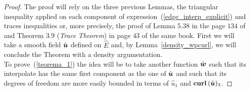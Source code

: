 \begin{proof}
The proof will rely on the three previous Lemmas, 
the triangular inequality applied on each component of 
expression~(\ref{edge_interp_explicit}) and traces inequalities or,
more precisely, the proof
of Lemma $5.38$ in the page $134$ of~\cite{monk}
and Theorem $3.9$ (\emph{Trace Theorem})
in page $43$ of
the same book.
First we will take a smooth field $\hat{\boldsymbol{u}}$ defined on $\hat{E}$
and, by Lemma~\ref{density_wpcurl}, we will conclude the Theorem 
with a density argumentation.\\[4pt]
To prove~(\ref{teorema_1}) the idea will be to take another function
$\hat{\boldsymbol{w}}$ such that its interpolate has the same first component
as the one of $\hat{\boldsymbol{u}}$ and such that its degrees of freedom are
more easily bounded in terms of $\hat{u}_1$ and $\textbf{curl\,}(\hat{\boldsymbol{u}})_3$.


\end{proof}
